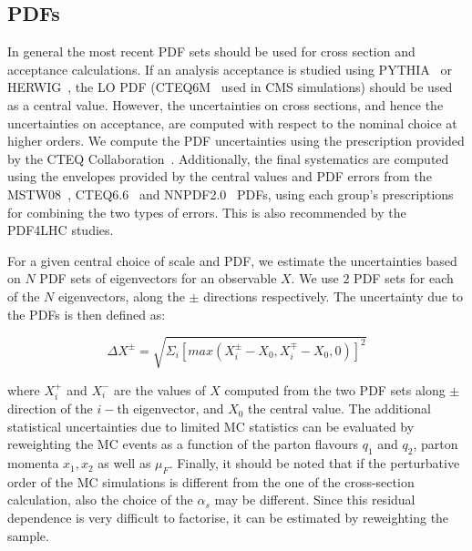 \subsection{PDFs}
In general the most recent PDF sets should be used for cross section and 
acceptance calculations. If an analysis acceptance is studied using 
PYTHIA~\cite{Pythia} or HERWIG~\cite{Herwig}, the LO PDF (CTEQ6M~\cite{cteq6m} 
used in CMS simulations) should be used as a central value. However, the 
uncertainties on cross sections, and hence the uncertainties on acceptance, are 
computed with respect to the nominal choice at higher orders. %
We compute the PDF uncertainties using the prescription provided by the CTEQ 
Collaboration~\cite{cteq6m}. Additionally, the final systematics are computed using
the envelopes provided by the central values and PDF errors from the MSTW08~\cite{mstw08}, 
CTEQ6.6~\cite{cteq66} and NNPDF2.0~\cite{nnpdf20} PDFs, using each group’s prescriptions for 
combining the two types of errors. This is also recommended by the PDF4LHC studies.
 

For a given central choice of scale and PDF, we estimate the uncertainties 
based on $N$ PDF sets of eigenvectors for an observable $X$. We use $2$ PDF 
sets for each of the $N$ eigenvectors, along the $\pm$ directions respectively. 
The uncertainty due to the PDFs is then defined as:

\begin{equation}
	\Delta X^{\pm} = \sqrt{\Sigma_i [max(X_i^\pm-X_0,X_i^\mp-X_0,0)]^2 }
\end{equation}

where $X_i^+$ and $X_i^-$ are the values of $X$ computed from the two PDF sets 
along $\pm$ direction of the $i-$th eigenvector, and $X_0$ the central value. 
The additional statistical 
uncertainties due to limited MC statistics can be evaluated by reweighting the 
MC events as a function of the parton flavours $q_1$ and $q_2$, parton momenta 
$x_1, x_2$ as well as $\mu_F$. Finally, it should be noted that if the perturbative
order of the MC simulations is different from the one of the cross-section 
calculation, also the choice of the $\alpha_s$ may be different. Since this 
residual dependence is very difficult to factorise, it can be estimated by 
reweighting the sample.
